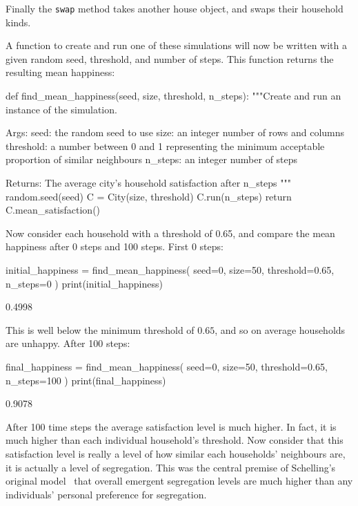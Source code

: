 Finally the \texttt{swap} method takes another house object, and
swaps their household kinds.

A function to create and run one of these simulations will now be written
with a given random seed, threshold, and number of steps. This function returns
the resulting mean happiness:

\begin{pyin}
def find_mean_happiness(seed, size, threshold, n_steps):
    """Create and run an instance of the simulation.

    Args:
        seed: the random seed to use
        size: an integer number of rows and columns
        threshold: a number between 0 and 1 representing
            the minimum acceptable proportion of similar
            neighbours
        n_steps: an integer number of steps

    Returns:
        The average city's household satisfaction after
        n_steps
    """
    random.seed(seed)
    C = City(size, threshold)
    C.run(n_steps)
    return C.mean_satisfaction()
\end{pyin}

Now consider each household with a threshold of
0.65, and compare the mean happiness after 0 steps and 100 steps.
First 0 steps:

\begin{pyin}
initial_happiness = find_mean_happiness(
    seed=0,
    size=50,
    threshold=0.65,
    n_steps=0
)
print(initial_happiness)
\end{pyin}

\begin{pyout}
0.4998
\end{pyout}

This is well below the minimum threshold of \(0.65\), and so on average
households are unhappy.
After 100 steps:

\begin{pyin}
final_happiness = find_mean_happiness(
    seed=0,
    size=50,
    threshold=0.65,
    n_steps=100
)
print(final_happiness)
\end{pyin}

\begin{pyout}
0.9078
\end{pyout}

After 100 time steps the average satisfaction level is much higher.
In fact, it is much higher than each individual household's threshold.
Now consider that this satisfaction level is really a level of how similar
each households' neighbours are, it is actually a level of segregation.
This was the central premise of Schelling's original
model~\cite{schelling2006micromotives}
that overall
emergent segregation levels are much higher than any individuals' personal
preference for segregation.

